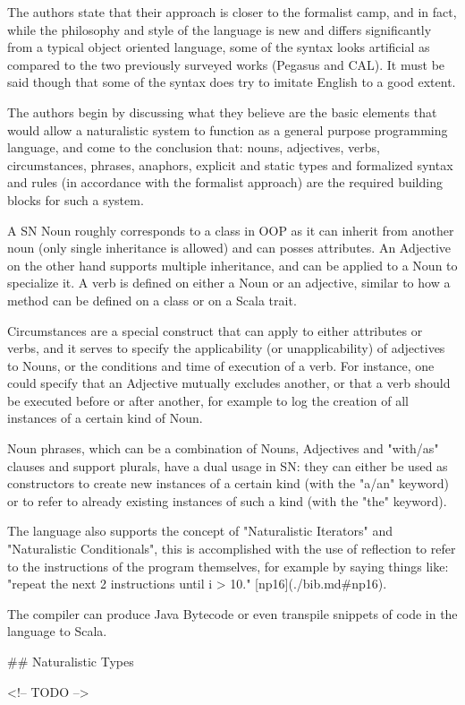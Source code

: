 The authors state that their approach is closer to the formalist camp, and in fact, while the philosophy and style of the language is new and differs significantly from a typical object oriented language, some of the syntax looks artificial as compared to the two previously surveyed works (Pegasus and CAL). It must be said though that some of the syntax does try to imitate English to a good extent.

The authors begin by discussing what they believe are the basic elements that would allow a naturalistic system to function as a general purpose programming language, and come to the conclusion that: nouns, adjectives, verbs, circumstances, phrases, anaphors, explicit and static types and formalized syntax and rules (in accordance with the formalist approach) are the required building blocks for such a system.

A SN Noun roughly corresponds to a class in OOP as it can inherit from another noun (only single inheritance is allowed) and can posses attributes. An Adjective on the other hand supports multiple inheritance, and can be applied to a Noun to specialize it. A verb is defined on either a Noun or an adjective, similar to how a method can be defined on a class or on a Scala trait.

Circumstances are a special construct that can apply to either attributes or verbs, and it serves to specify the applicability (or unapplicability) of adjectives to Nouns, or the conditions and time of execution of a verb. For instance, one could specify that an Adjective mutually excludes another, or that a verb should be executed before or after another, for example to log the creation of all instances of a certain kind of Noun.

Noun phrases, which can be a combination of Nouns, Adjectives and "with/as" clauses and support plurals, have a dual usage in SN: they can either be used as constructors to create new instances of a certain kind (with the "a/an" keyword) or to refer to already existing instances of such a kind (with the "the" keyword).

The language also supports the concept of "Naturalistic Iterators" and "Naturalistic Conditionals", this is accomplished with the use of reflection to refer to the instructions of the program themselves, for example by saying things like: "repeat the next 2 instructions until i > 10." [np16](./bib.md#np16).

The compiler can produce Java Bytecode or even transpile snippets of code in the language to Scala.

## Naturalistic Types

<!-- TODO -->
